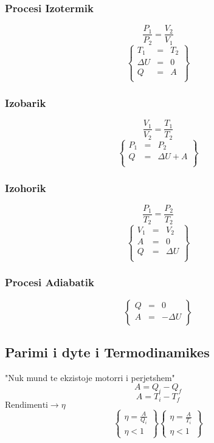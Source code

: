 \documentclass[a4paper, twocolumn]{article}
\begin{document}
\subsubsection{Procesi Izotermik}
 \[
\frac{P_{1}}{P_{2}} = \frac{V_{2}}{V_{1}}
\] 
\[
\begin{Bmatrix}
T_{1}&=&T_{2} \\
\Delta U &=& 0 \\
Q &= &A \\
\end{Bmatrix}
\]
\subsubsection{Izobarik}
\[
\frac{V_{1}}{V_{2}} = \frac{T_{1}}{T_{2}}
\] 
\[
\begin{Bmatrix}
P_{1}&= &P_{2} \\
Q&=&\Delta U + A\\
\end{Bmatrix}
\]
\subsubsection{Izohorik}
\[
\frac{P_{1}}{T_{2}} = \frac{P_{2}}{T_{2}}
\] 
\[
\begin{Bmatrix}
V_{1}&=& V_{2} \\
A&=&0\\
Q&=&\Delta U\\
\end{Bmatrix}
\]
\subsubsection{Procesi Adiabatik}
\[
\begin{Bmatrix}
Q&=&0\\
A&=&-\Delta U\\
\end{Bmatrix}
\]
\subsection{Parimi i dyte i Termodinamikes}
"Nuk mund te ekzistoje motorri i perjetshem"
\[
A=Q_{i}-Q_{f}
\] 
\[
A=T_{i}-T_{f}
\]
$ \text{Rendimenti} \to \eta $
\[
\begin{Bmatrix}
	\eta = \frac{A}{Q_{i}}\\
	\eta < 1
\end{Bmatrix}
\begin{Bmatrix}
	\eta = \frac{A}{T_{i}}\\
	\eta < 1
\end{Bmatrix}
\] 
\end{document}

